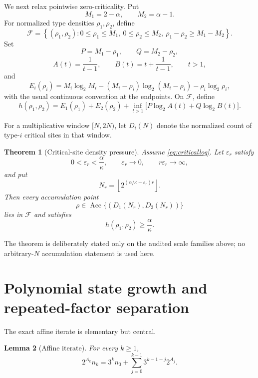 \documentclass[11pt]{amsart}
\newtheorem{theorem}{Theorem}[section]
\newtheorem{lemma}[theorem]{Lemma}
\newcommand{\Fcal}{\mathcal F}
\newcommand{\Acc}{\operatorname{Acc}}
\begin{document}
We next relax pointwise zero-criticality.  Put
\[
 M_1=2-\alpha,
 \qquad
 M_2=\alpha-1.
\]
For normalized type densities \(\rho_1,\rho_2\), define
\begin{equation}\label{eq:F}
 \Fcal=
 \left\{(\rho_1,\rho_2):
 0\le\rho_1\le M_1,
 \ 0\le\rho_2\le M_2,
 \ \rho_1-\rho_2\ge M_1-M_2
 \right\}.
\end{equation}
Set
\[
 P=M_1-\rho_1,
 \qquad
 Q=M_2-\rho_2,
\]
\[
 A(t)=\frac1{t-1},
 \qquad
 B(t)=t+\frac1{t-1},
 \qquad t>1,
\]
and
\[
 E_i(\rho_i)
 =M_i\log_2M_i
 -(M_i-\rho_i)\log_2(M_i-\rho_i)
 -\rho_i\log_2\rho_i,
\]
with the usual continuous convention at the endpoints.  On \(\Fcal\), define
\begin{equation}\label{eq:surface}
 h(\rho_1,\rho_2)
 =E_1(\rho_1)+E_2(\rho_2)
 +\inf_{t>1}
 \big[P\log_2A(t)+Q\log_2B(t)\big].
\end{equation}

For a multiplicative window \([N,2N)\), let \(D_i(N)\) denote the normalized count of type-\(i\) critical sites in that window.

\begin{theorem}[Critical-site density pressure]\label{thm:density}
Assume \eqref{eq:criticallog}.  Let \(\varepsilon_r\) satisfy
\[
 0<\varepsilon_r<\frac{\alpha}{\kappa},
 \qquad
 \varepsilon_r\to0,
 \qquad
 r\varepsilon_r\to\infty,
\]
and put
\[
 N_r=\left\lfloor
 2^{(\alpha/\kappa-\varepsilon_r)r}
 \right\rfloor.
\]
Then every accumulation point
\[
 \rho\in\Acc\{(D_1(N_r),D_2(N_r))\}
\]
lies in \(\Fcal\) and satisfies
\[
 h(\rho_1,\rho_2)\ge\frac{\alpha}{\kappa}.
\]
\end{theorem}

The theorem is deliberately stated only on the audited scale families above; no arbitrary-\(N\) accumulation statement is used here.

\section{Polynomial state growth and repeated-factor separation}

The exact affine iterate is elementary but central.

\begin{lemma}[Affine iterate]\label{lem:affine}
For every \(k\ge1\),
\begin{equation}\label{eq:affineiterate}
 2^{A_k}n_k
 =3^k n_0+\sum_{j=0}^{k-1}3^{k-1-j}2^{A_j}.
\end{equation}
\end{lemma}
\end{document}
